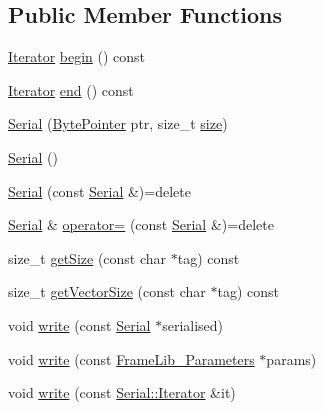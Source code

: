\subsection*{Public Member Functions}
\begin{DoxyCompactItemize}
\item 
\hyperlink{class_frame_lib___parameters_1_1_serial_1_1_iterator}{Iterator} \hyperlink{class_frame_lib___parameters_1_1_serial_ab77262d400858fad2affc7d9bb10f175}{begin} () const
\item 
\hyperlink{class_frame_lib___parameters_1_1_serial_1_1_iterator}{Iterator} \hyperlink{class_frame_lib___parameters_1_1_serial_a25338dbe2059c9cd615db0596a09a646}{end} () const
\item 
\hyperlink{class_frame_lib___parameters_1_1_serial_a240eb02a38ab2e545c088f63df9f1851}{Serial} (\hyperlink{_frame_lib___types_8h_a2c5689a997a12479b7d925e565428141}{Byte\+Pointer} ptr, size\+\_\+t \hyperlink{class_frame_lib___parameters_1_1_serial_a04ad46904d9fd8119283eae663901886}{size})
\item 
\hyperlink{class_frame_lib___parameters_1_1_serial_af433868e4f3db5ef6581e3aae7b430a6}{Serial} ()
\item 
\hyperlink{class_frame_lib___parameters_1_1_serial_a4f3fd7375cc68825e292bb7e78d68678}{Serial} (const \hyperlink{class_frame_lib___parameters_1_1_serial}{Serial} \&)=delete
\item 
\hyperlink{class_frame_lib___parameters_1_1_serial}{Serial} \& \hyperlink{class_frame_lib___parameters_1_1_serial_aaadeaff5922d0e53fb68555459a9ffeb}{operator=} (const \hyperlink{class_frame_lib___parameters_1_1_serial}{Serial} \&)=delete
\item 
size\+\_\+t \hyperlink{class_frame_lib___parameters_1_1_serial_a7956b32404985b873fff0c94d565c651}{get\+Size} (const char $\ast$tag) const
\item 
size\+\_\+t \hyperlink{class_frame_lib___parameters_1_1_serial_a711555a8768d9af332938baffb5e2186}{get\+Vector\+Size} (const char $\ast$tag) const
\item 
void \hyperlink{class_frame_lib___parameters_1_1_serial_acc45d51259fea82f898550856e79a493}{write} (const \hyperlink{class_frame_lib___parameters_1_1_serial}{Serial} $\ast$serialised)
\item 
void \hyperlink{class_frame_lib___parameters_1_1_serial_a8b9707ad07ecb67ee347d9d07ab6e6e3}{write} (const \hyperlink{class_frame_lib___parameters}{Frame\+Lib\+\_\+\+Parameters} $\ast$params)
\item 
void \hyperlink{class_frame_lib___parameters_1_1_serial_ad4942b3ab3c8ef54c5e92a8ec0ab4f20}{write} (const \hyperlink{class_frame_lib___parameters_1_1_serial_1_1_iterator}{Serial\+::\+Iterator} \&it)

\end{DoxyCompactItemize}
